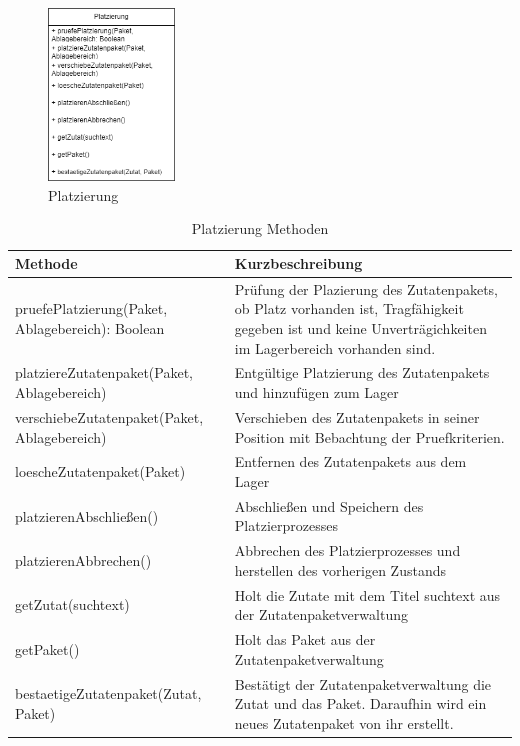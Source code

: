 \begin{figure}[H]
    \centering
    \includegraphics[width=0.3\textwidth]{Bilder/Kapitel/Bausteinsicht/Platzierung}
    \caption{Platzierung}
    \label{fig:Platzierung}
\end{figure}

\begin{table}[h]
    \centering
    \begin{tabularx}{\textwidth}{ l|X }
        \textbf{Methode} & \textbf{Kurzbeschreibung}\\
        \hline
        pruefePlatzierung(Paket, Ablagebereich): Boolean & Prüfung der Plazierung des Zutatenpakets, ob Platz
        vorhanden ist, Tragfähigkeit gegeben ist und keine Unverträgichkeiten im Lagerbereich vorhanden sind.\\
        \hline
        platziereZutatenpaket(Paket, Ablagebereich) & Entgültige Platzierung des Zutatenpakets und hinzufügen zum
        Lager\\
        \hline
        verschiebeZutatenpaket(Paket, Ablagebereich) & Verschieben des Zutatenpakets in seiner Position mit
        Bebachtung der Pruefkriterien.\\
        \hline
        loescheZutatenpaket(Paket) & Entfernen des Zutatenpakets aus dem Lager\\
        \hline
        platzierenAbschließen() & Abschließen und Speichern des Platzierprozesses\\
        \hline
        platzierenAbbrechen() & Abbrechen des Platzierprozesses und herstellen des vorherigen Zustands\\
        \hline
        getZutat(suchtext) & Holt die Zutate mit dem Titel suchtext aus der Zutatenpaketverwaltung\\
        \hline
        getPaket() & Holt das Paket aus der Zutatenpaketverwaltung\\
        \hline
        bestaetigeZutatenpaket(Zutat, Paket) & Bestätigt der Zutatenpaketverwaltung die Zutat und das Paket. Daraufhin
        wird ein neues Zutatenpaket von ihr erstellt.\\
    \end{tabularx}
    \caption{Platzierung Methoden}
    \label{tab:Platzierung_Methoden}
\end{table}

